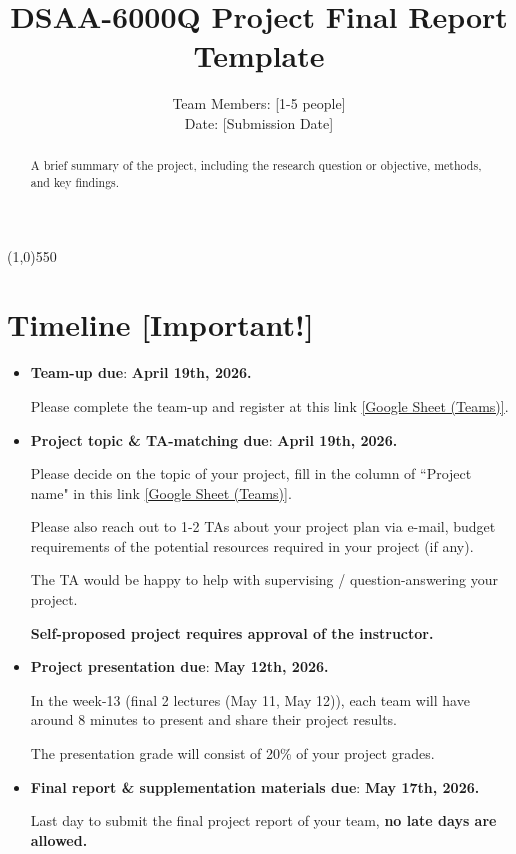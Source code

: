 \documentclass{article}
\title{DSAA-6000Q Project Final Report Template}
\author{Team Members: [1-5 people] \\ Date: [Submission Date]}
\date{}
\begin{document}
\maketitle



\begin{abstract}
A brief summary of the project, including the research question or objective, methods, and key findings.
\end{abstract}
\line(1,0){550} 
\section*{Timeline [Important!]}
\begin{itemize}
    \item \textbf{Team-up due}: {\textbf{\color{red} April 19th, 2026.}} 
    
    Please complete the team-up and register at this link \href{https://docs.google.com/spreadsheets/d/1FJsGVfhf7oHint2zKoZ13pNIbClVsMkPLsbs6yYbZAE/edit?usp=sharing}{[Google Sheet (Teams)]}.
    \item \textbf{Project topic \& TA-matching due}: {\textbf{\color{red} April 19th, 2026.}}

    Please decide on the topic of your project, fill in the column of ``Project name" in this link \href{https://docs.google.com/spreadsheets/d/1FJsGVfhf7oHint2zKoZ13pNIbClVsMkPLsbs6yYbZAE/edit?usp=sharing}{[Google Sheet (Teams)]}.

    Please also reach out to 1-2 TAs about your project plan via e-mail, budget requirements of the potential resources required in your project (if any). 
    
    The TA would be happy to help with supervising / question-answering your project.  

    {\textbf{\color{red} Self-proposed project requires approval of the instructor.}}
    \item \textbf{Project presentation due}: {\textbf{\color{red} May 12th, 2026.}}

    In the week-13 (final 2 lectures (May 11, May 12)), each team will have around 8 minutes to present and share their project results.

    The presentation grade will consist of 20\% of your project grades.
    \item \textbf{Final report \& supplementation materials due}: {\textbf{\color{red} May 17th, 2026.}}

    Last day to submit the final project report of your team, {\textbf{\color{red} no late days are allowed.}}
\end{itemize}
\end{document}
